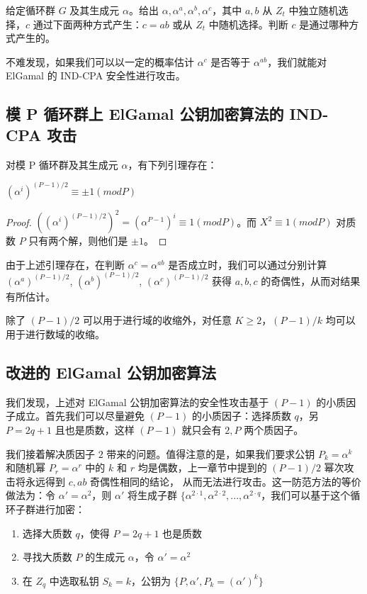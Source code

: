 \begin{theorem}
	给定循环群 $G$ 及其生成元 $\alpha$。给出 $\alpha, \alpha^a, \alpha^b, \alpha^c$，其中 $a, b$ 从 $Z_t$ 中独立随机选择，$c$ 通过下面两种方式产生：$c = ab$ 或从 $Z_t$ 中随机选择。判断 $c$ 是通过哪种方式产生的。
\end{theorem}

不难发现，如果我们可以以一定的概率估计 $\alpha^c$ 是否等于 $\alpha^{ab}$，我们就能对 ElGamal 的 IND-CPA 安全性进行攻击。

\subsection{模 P 循环群上 ElGamal 公钥加密算法的 IND-CPA 攻击}

对模 P 循环群及其生成元 $\alpha$，有下列引理存在：

\begin{lemma}
	$(\alpha^i)^{(P-1)/2} \equiv \pm 1 (mod P)$
\end{lemma}

\begin{proof}
	$((\alpha^i)^{(P-1)/2})^2 = (\alpha^{P-1})^i \equiv 1 (mod P)$。而 $X^2 \equiv 1 (mod P)$ 对质数 $P$ 只有两个解，则他们是 $\pm 1$。
\end{proof}

由于上述引理存在，在判断 $\alpha^c = \alpha^{ab}$ 是否成立时，我们可以通过分别计算 $(\alpha^a)^{(P-1)/2}$, $(\alpha^b)^{(P-1)/2}$, $(\alpha^c)^{(P-1)/2}$ 获得 $a, b, c$ 的奇偶性，从而对结果有所估计。

除了 $(P-1)/2$ 可以用于进行域的收缩外，对任意 $K \ge 2$，$(P-1)/k$ 均可以用于进行数域的收缩。

\subsection{改进的 ElGamal 公钥加密算法}

我们发现，上述对 ElGamal 公钥加密算法的安全性攻击基于 $(P-1)$ 的小质因子成立。首先我们可以尽量避免 $(P-1)$ 的小质因子：选择质数 $q$，另 $P = 2q + 1$ 且也是质数，这样 $(P - 1)$ 就只会有 $2, P$ 两个质因子。

我们接着解决质因子 $2$ 带来的问题。值得注意的是，如果我们要求公钥 $P_k = \alpha^k$ 和随机幂 $P_r = \alpha^r$ 中的 $k$ 和 $r$ 均是偶数，上一章节中提到的 $(P-1)/2$ 幂次攻击将永远得到 $c, ab$ 奇偶性相同的结论，
从而无法进行攻击。这一防范方法的等价做法为：令 $\alpha' = \alpha^2$，则 $\alpha'$ 将生成子群 $\{\alpha^{2 \cdot 1}, \alpha^{2 \cdot 2}, ..., \alpha^{2 \cdot q}$，我们可以基于这个循环子群进行加密：

\begin{enumerate}
	\item 选择大质数 $q$，使得 $P = 2q + 1$ 也是质数
	\item 寻找大质数 $P$ 的生成元 $\alpha$，令 $\alpha' = \alpha^2$
	\item 在 $Z_q$ 中选取私钥 $S_k = k$，公钥为 $\{P, \alpha', P_k = (\alpha')^k\}$
\end{enumerate}